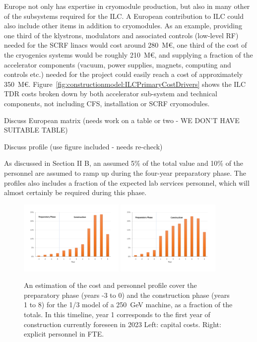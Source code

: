 \documentclass[%
 reprint,
 amsmath,amssymb,
 aps,
]{revtex4-1}
\begin{document}
Europe not only has expertise in cryomodule production, but also in many other 
of the subsystems required for the ILC. A European contribution to ILC could 
also include other items in addition to cryomodules. As an example, providing 
one third of the klystrons, modulators and associated controls (low-level RF) 
needed for the SCRF linacs would cost around 280~M\euro{}, one third of the cost of 
the cryogenics systems would be roughly 210~M\euro{}, and supplying a fraction of the 
accelerator components (vacuum, power supplies, magnets, computing and controls 
etc.) needed for the project could easily reach a cost of approximately 350~M\euro{}. 
Figure~\ref{fig:constructionmodel:ILCPrimaryCostDrivers} shows the ILC TDR costs broken down by both accelerator sub-system and 
technical components, not including CFS, installation or SCRF cryomodules.

Discuss European matrix (needs work on a table or two - WE DON'T HAVE SUITABLE TABLE) 

Discuss profile (use figure included - needs re-check)

As discussed in Section II B, an assumed 5\% of the total value and 10\% of the personnel are assumed
to ramp up during the four-year preparatory phase. The profiles also includes a fraction
of the expected lab services personnel, which will almost certainly be required during this
phase. 

\begin{figure}[htbp]
\includegraphics[width=0.45\textwidth]{figures/profile-250GeV-MEUR-norm.pdf}
\includegraphics[width=0.45\textwidth]{figures/profile-250GeV-FTE-norm.pdf}
\caption{\label{fig:costprofile:costprofile} An estimation of the cost and personnel profile cover the preparatory phase (years -3 to 0) 
and the construction phase (years 1 to 8) for the 1/3 model of a 250~GeV machine, as a fraction of the
totals. In this timeline, 
year 1 corresponds to the first year of construction currently foreseen in 2023 
Left: capital costs. Right: explicit personnel in FTE.
}
\end{figure}
\end{document}
